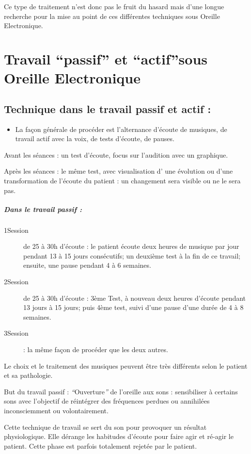 \documentclass[12pt,french]{report}
\begin{document}
Ce type de traitement n'est donc pas le fruit du hasard mais d'une
longue recherche pour la mise au point de ces différentes techniques
sous Oreille Electronique.

\section{Travail ``passif'' et ``actif''sous Oreille Electronique}

\subsection{Technique dans le travail passif et actif : }
\begin{itemize}
\item La façon générale de procéder est l'alternance d'écoute de musiques,
de travail actif avec la voix, de tests d'écoute, de pauses.
\end{itemize}
Avant les séances : un test d'écoute, focus sur l'audition avec un
graphique.

Après les séances : le même test, avec visualisation d' une évolution
ou d'une transformation de l'écoute du patient : un changement sera
visible ou ne le sera pas.

\subparagraph{Dans le travail passif : }
\begin{description}
\item [{1\textdegree Session}] de 25 à 30h d'écoute : le patient écoute
deux heures de musique par jour pendant 13 à 15 jours consécutifs;
un deuxième test à la fin de ce travail; ensuite, une pause pendant
4 à 6 semaines.
\item [{2\textdegree Session}] de 25 à 30h d'écoute : 3ème Test, à nouveau
deux heures d'écoute pendant 13 jours à 15 jours; puis 4ème test,
suivi d'une pause d'une durée de 4 à 8 semaines.
\item [{3\textdegree Session}] : la même façon de procéder que les deux
autres. 
\end{description}
Le choix et le traitement des musiques peuvent être très différents
selon le patient et sa pathologie.

But du travail passif : \emph{``}Ouverture\emph{'' }de l'oreille
aux sons : sensibiliser à certains sons avec l'objectif de réintégrer
des fréquences perdues ou annihilées inconsciemment ou volontairement. 

Cette technique de travail se sert du son pour provoquer un résultat
physiologique. Elle dérange les habitudes d'écoute pour faire agir
et ré-agir le patient. Cette phase est parfois totalement rejetée
par le patient.
\end{document}
